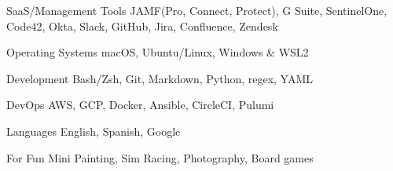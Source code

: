 

\begin{cvskills}


	\cvskill
	{SaaS/Management Tools} %
	{JAMF(Pro, Connect, Protect), G Suite, SentinelOne, Code42, Okta, Slack, GitHub, Jira, Confluence, Zendesk} %

	\cvskill
	{Operating Systems} %
	{macOS, Ubuntu/Linux, Windows \& WSL2} %

	\cvskill
	{Development} %
	{Bash/Zsh, Git, Markdown, Python, regex, YAML} %

	\cvskill
	{DevOps} %
	{AWS, GCP, Docker, Ansible, CircleCI, Pulumi} %

	\cvskill
	{Languages} %
	{English, Spanish, Google} %

	\cvskill
	{For Fun}
	{Mini Painting, Sim Racing, Photography, Board games}

\end{cvskills}

